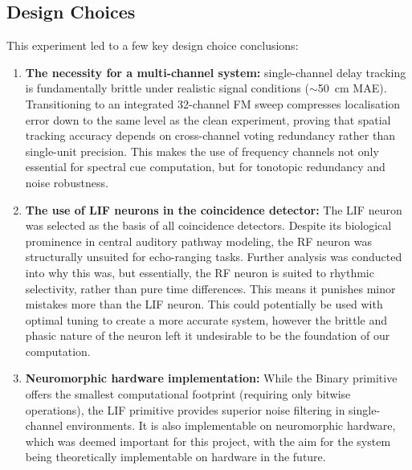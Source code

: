 \subsection{Design Choices}

This experiment led to a few key design choice conclusions:

\begin{enumerate}
    \item \textbf{The necessity for a multi-channel system:} single-channel delay tracking is fundamentally brittle under realistic signal conditions ($\sim$50~cm MAE). Transitioning to an integrated 32-channel FM sweep compresses localisation error down to the same level as the clean experiment, proving that spatial tracking accuracy depends on cross-channel voting redundancy rather than single-unit precision. This makes the use of frequency channels not only essential for spectral cue computation, but for tonotopic redundancy and noise robustness.
    \item \textbf{The use of LIF neurons in the coincidence detector:} The LIF neuron was selected as the basis of all coincidence detectors. Despite its biological prominence in central auditory pathway modeling, the RF neuron was structurally unsuited for echo-ranging tasks. Further analysis was conducted into why this was, but essentially, the RF neuron is suited to rhythmic selectivity, rather than pure time differences. This means it punishes minor mistakes more than the LIF neuron. This could potentially be used with optimal tuning to create a more accurate system, however the brittle and phasic nature of the neuron left it undesirable to be the foundation of our computation.
    \item \textbf{Neuromorphic hardware implementation:} While the Binary primitive offers the smallest computational footprint (requiring only bitwise operations), the LIF primitive provides superior noise filtering in single-channel environments. It is also implementable on neuromorphic hardware, which was deemed important for this project, with the aim for the system being theoretically implementable on hardware in the future.
\end{enumerate}



